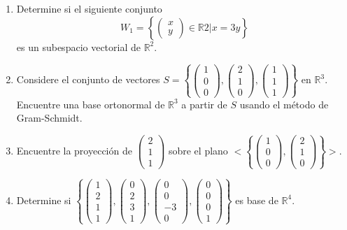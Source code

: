 \documentclass[12pt]{article}
\newcommand{\R}{\mathbb{R}}
\theoremstyle{exampstyle}
\theoremstyle{definition}
\theoremstyle{break}
\numberwithin{equation}{section}
\begin{document}
\begin{enumerate}


\item Determine si el siguiente conjunto 
\[W_1= \left\{ \begin{pmatrix} x \\ y \end{pmatrix} \in \R{2} | x=3y \right\}\]
es un subespacio vectorial de $\R^{2}$.



\item Considere el conjunto de vectores $S = \left\{ \begin{pmatrix} 1 \\ 0 \\ 0 \end{pmatrix} , \begin{pmatrix} 2 \\ 1 \\ 0 \end{pmatrix} , \begin{pmatrix} 1 \\ 1 \\ 1 \end{pmatrix} \right\}$ en $\R^{3}$. Encuentre una base ortonormal de $\R^{3}$ a partir de $S$ usando el método de Gram-Schmidt.
    \item Encuentre la proyección de $\begin{pmatrix} 2 \\ 1 \\ 1 \end{pmatrix}$ sobre el plano $<\left\{ \begin{pmatrix} 1 \\ 0 \\ 0 \end{pmatrix} , \begin{pmatrix} 2 \\ 1 \\ 0 \end{pmatrix} \right\}  >$.


\item Determine si $\left\{ \begin{pmatrix} 1 \\ 2 \\ 1 \\ 1 \end{pmatrix}, \begin{pmatrix} 0 \\ 2 \\ 3 \\ 1 \end{pmatrix}, \begin{pmatrix} 0 \\ 0 \\ -3 \\ 0 \end{pmatrix}, \begin{pmatrix} 0 \\ 0 \\ 0 \\ 1 \end{pmatrix} \right\}$ es base de $\R^{4}$.


\end{enumerate}
\end{document}
